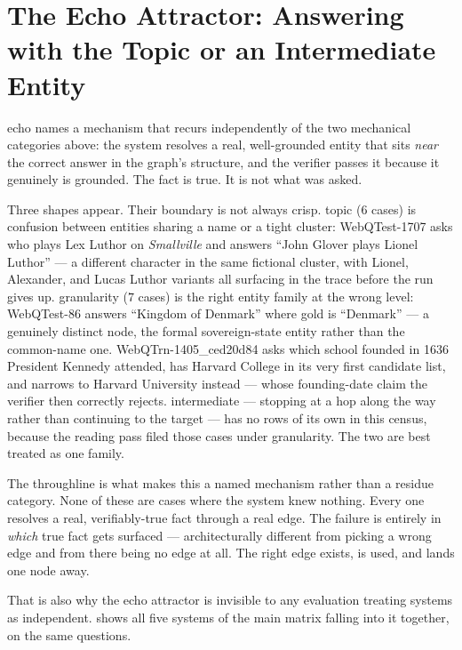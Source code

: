 \section{The Echo Attractor: Answering with the Topic or an Intermediate
Entity}\label{sec:echo}

\textsf{echo} names a mechanism that recurs independently of the two mechanical
categories above: the system resolves a real, well-grounded entity that
sits \emph{near} the correct answer in the graph's
structure, and the verifier passes it because it genuinely is grounded. The fact
is true. It is not what was asked.

Three shapes appear. Their boundary is not always crisp. \textsf{topic} ($6$
cases) is confusion between entities sharing a name or a tight cluster:
\textsf{WebQTest-1707} asks who plays Lex Luthor on \emph{Smallville} and
answers ``John Glover plays Lionel Luthor'' --- a different character in the
same fictional cluster, with Lionel, Alexander, and Lucas Luthor variants all
surfacing in the trace before the run gives up. \textsf{granularity} ($7$ cases)
is the right entity family at the wrong level: \textsf{WebQTest-86} answers
``Kingdom of Denmark'' where gold is ``Denmark'' --- a genuinely distinct node,
the formal sovereign-state entity rather than the common-name one.
\textsf{WebQTrn-1405\_ced20d84} asks which school founded in 1636 President
Kennedy attended, has \textsf{Harvard College} in its very first candidate list,
and narrows to \textsf{Harvard University} instead --- whose founding-date claim
the verifier then correctly rejects. \textsf{intermediate} --- stopping at a hop
along the way rather than continuing to the target --- has no rows of its own in
this census, because the reading pass filed those cases under
\textsf{granularity}. The two are best treated as one family.

The throughline is what makes this a named mechanism rather than a residue
category. None of these are cases where the system knew nothing. Every one
resolves a real, verifiably-true fact through a real edge. The failure is
entirely in \emph{which} true fact gets surfaced --- architecturally different
from picking a wrong edge and from there being no edge at all. The right edge
exists, is used, and lands one node away.

That is also why the echo attractor is invisible to any evaluation treating
systems as independent.  shows all five systems of
the main matrix falling into it together, on the same questions.

